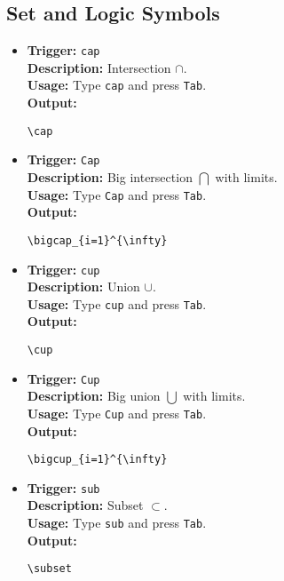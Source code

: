 \documentclass{article}
\begin{document}
\subsection{Set and Logic Symbols}
\begin{itemize}[leftmargin=*, label={}]
\item \textbf{Trigger:} \texttt{cap} \\
\textbf{Description:} Intersection \(\cap\). \\
\textbf{Usage:} Type \texttt{cap} and press \texttt{Tab}. \\
\textbf{Output:}
\begin{verbatim}
\cap 
\end{verbatim}

\item \textbf{Trigger:} \texttt{Cap} \\
\textbf{Description:} Big intersection \(\bigcap\) with limits. \\
\textbf{Usage:} Type \texttt{Cap} and press \texttt{Tab}. \\
\textbf{Output:}
\begin{verbatim}
\bigcap_{i=1}^{\infty}
\end{verbatim}

\item \textbf{Trigger:} \texttt{cup} \\
\textbf{Description:} Union \(\cup\). \\
\textbf{Usage:} Type \texttt{cup} and press \texttt{Tab}. \\
\textbf{Output:}
\begin{verbatim}
\cup 
\end{verbatim}

\item \textbf{Trigger:} \texttt{Cup} \\
\textbf{Description:} Big union \(\bigcup\) with limits. \\
\textbf{Usage:} Type \texttt{Cup} and press \texttt{Tab}. \\
\textbf{Output:}
\begin{verbatim}
\bigcup_{i=1}^{\infty}
\end{verbatim}

\item \textbf{Trigger:} \texttt{sub} \\
\textbf{Description:} Subset \(\subset\). \\
\textbf{Usage:} Type \texttt{sub} and press \texttt{Tab}. \\
\textbf{Output:}
\begin{verbatim}
\subset 
\end{verbatim}


\end{itemize}
\end{document}

